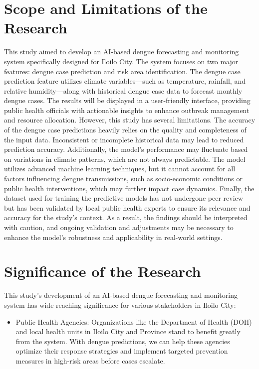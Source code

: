 \section{Scope and Limitations of the Research}
\label{sec:scopelimitations}

This study aimed to develop an AI-based dengue forecasting and monitoring system specifically designed for Iloilo City. The system focuses on two major features: dengue case prediction and risk area identification. The dengue case prediction feature utilizes climate variables—such as temperature, rainfall, and relative humidity—along with historical dengue case data to forecast monthly dengue cases. The results will be displayed in a user-friendly interface, providing public health officials with actionable insights to enhance outbreak management and resource allocation.
However, this study has several limitations. The accuracy of the dengue case predictions heavily relies on the quality and completeness of the input data. Inconsistent or incomplete historical data may lead to reduced prediction accuracy. Additionally, the model’s performance may fluctuate based on variations in climate patterns, which are not always predictable.
The model utilizes advanced machine learning techniques, but it cannot account for all factors influencing dengue transmissions, such as socio-economic conditions or public health interventions, which may further impact case dynamics.
Finally, the dataset used for training the predictive models has not undergone peer review but has been validated by local public health experts to ensure its relevance and accuracy for the study's context. As a result, the findings should be interpreted with caution, and ongoing validation and adjustments may be necessary to enhance the model's robustness and applicability in real-world settings.


\section{Significance of the Research}
\label{sec:significance}

This study’s development of an AI-based dengue forecasting and monitoring system has wide-reaching significance for various stakeholders in Iloilo City:

\begin{itemize}
\item  Public Health Agencies: Organizations like the Department of Health (DOH) and local health units in Iloilo City and Province stand to benefit greatly from the system. With dengue predictions, we can help these agencies optimize their response strategies and implement targeted prevention measures in high-risk areas before cases escalate.
\end{itemize}

